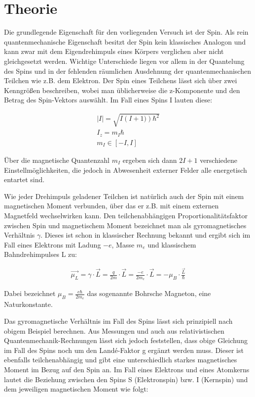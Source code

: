 \section{Theorie}
Die grundlegende Eigenschaft für den vorliegenden Versuch ist der Spin. Als rein quantenmechanische Eigenschaft besitzt der Spin kein klassisches Analogon und kann zwar mit dem Eigendrehimpuls eines Körpers verglichen aber nicht gleichgesetzt werden. Wichtige Unterschiede liegen vor allem in der Quantelung des Spins und in der fehlenden räumlichen Ausdehnung der quantenmechanischen Teilchen wie z.B. dem Elektron. Der Spin eines Teilchens lässt sich über zwei Kenngrößen beschreiben, wobei man üblicherweise die z-Komponente und den Betrag des Spin-Vektors auswählt. Im Fall eines Spins I lauten diese:

\begin{align}
\vert I \vert = \sqrt{I\left(I+1)\right)\hbar^2} \\
I_z=m_I \hbar \\
m_I \in [-I,I]
\end{align}

Über die magnetische Quantenzahl $m_I$ ergeben sich dann $2I+1$ verschiedene Einstellmöglichkeiten, die jedoch in Abwesenheit externer Felder alle energetisch entartet sind.

Wie jeder Drehimpuls geladener Teilchen ist natürlich auch der Spin mit einem magnetischen Moment verbunden, über das er z.B. mit einem externen Magnetfeld wechselwirken kann. Den teilchenabhängigen Proportionalitätsfaktor zwischen Spin und magnetischem Moment bezeichnet man als gyromagnetisches Verhältnis $\gamma$. Dieses ist schon in klassischer Rechnung bekannt und ergibt sich im Fall eines Elektrons mit Ladung $-e$, Masse $m_e$ und klassischem Bahndrehimpulses L zu:

\begin{align}
\overrightarrow{\mu_L}=\gamma \cdot \overrightarrow{L} = \frac{q}{2m}\cdot \overrightarrow{L}=\frac{-e}{2m_e}\cdot \overrightarrow{L} = -\mu_B \cdot \frac{\overrightarrow{L}}{\hbar}
\end{align}

Dabei bezeichnet $\mu_B=\frac{e\hbar}{2m_e}$ das sogenannte Bohrsche Magneton, eine Naturkonstante. 

Das gyromagnetische Verhältnis im Fall des Spins lässt sich prinzipiell nach obigem Beispiel berechnen. Aus Messungen und auch aus relativistischen Quantenmechanik-Rechnungen lässt sich jedoch feststellen, dass obige Gleichung im Fall des Spins noch um den Landé-Faktor g ergänzt werden muss. Dieser ist ebenfalls teilchenabhängig und gibt eine unterschiedlich starkes magnetisches Moment im Bezug auf den Spin an. Im Fall eines Elektrons und eines Atomkerns lautet die Beziehung zwischen den Spins S (Elektronspin) bzw. I (Kernspin) und dem jeweiligen magnetischen Moment wie folgt:

